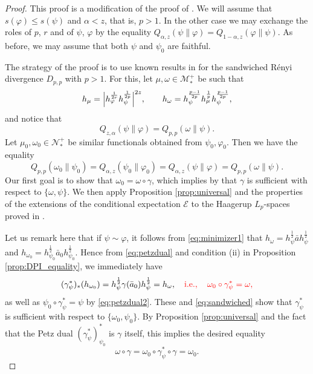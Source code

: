\documentclass[12pt]{article}
\theoremstyle{definition}
\theoremstyle{remark}
\numberwithin{equation}{section}
\def\cE{\mathcal E}
\def\Me{\mathcal M}
\def\Ne{\mathcal N}
\def\ffi{\varphi}
\begin{document}
\begin{proof} This proof is a modification of the proof of \cite[Theorem
5.1]{jencova2021renyi}.  
We will assume that $s(\ffi)\le s(\psi)$ and $\alpha<z$, that is, $p>1$. In the other case we may
exchange the roles of $p$, $r$ and of $\psi$, $\ffi$ by the equality
$Q_{\alpha,z}(\psi\|\varphi)=Q_{1-\alpha,z}(\varphi\|\psi)$. As before, we may assume that
both $\psi$ and $\psi_0$ are faithful.

The strategy of the proof is to use known results in \cite{jencova2018renyi} for the sandwiched
R\'enyi divergence $D_{p,p}$ with $p>1$. For this, {\color{red}let $\mu,\omega\in\Me_*^+$ be such that
\[
h_{\mu}=\Big|h_{\ffi}^{1\over 2r}h_{\psi}^{1\over 2p}\Big|^{2z},\qquad
h_\omega=h_\psi^{p-1\over 2p}h_\mu^{\frac1p}h_\psi^{p-1\over 2p},
\]}
and notice that
\[
Q_{z,\alpha}(\psi\|\ffi)=Q_{p,p}(\omega\|\psi).
\]
Let $\mu_0,\omega_0\in \Ne_*^+$ be similar functionals obtained from $\psi_0,\ffi_0$. Then
we have the equality
\begin{equation}\label{eq:sandwiched}
Q_{p,p}(\omega_0\|\psi_0)=Q_{\alpha,z}(\psi_0\|\ffi_0)=Q_{\alpha,z}(\psi\|\ffi)=Q_{p,p}(\omega\|\psi).
\end{equation}
Our first goal is to show that $\omega_0=\omega\circ\gamma$, which implies by
\cite[Theorem 4.6]{jencova2018renyi} that $\gamma$ is sufficient with respect to $\{\omega,\psi\}$. 
We then apply Proposition \ref{prop:universal} and the properties of the extensions of the
conditional expectation $\cE$ to the Haagerup $L_p$-spaces proved in
\cite{junge2003noncommutative}. 

Let us remark here that if $\psi\sim \ffi$, {\color{red}it follows from \eqref{eq:minimizer1} that}
$h_\omega=h_\psi^{\frac12}\bar ah_\psi^{\frac12}$ and
$h_{\omega_0}=h_{\psi_0}^{\frac12}\bar a_0h_{\psi_0}^{\frac12}$. Hence from {\color{red}\eqref{eq:petzdual}
and condition (ii)} in Proposition \ref{prop:DPI_equality}, we immediately have
\[
(\gamma^*_{\psi})_*(h_{\omega_0})=h_\psi^{\frac12}\gamma(\bar
a_0)h_\psi^{\frac12}=h_\omega,\quad
{\color{red}\mbox{i.e.},\quad\omega_0\circ\gamma_\psi^*=\omega,}
\]
{\color{red}as well as $\psi_0\circ\gamma_\psi^*=\psi$ by \eqref{eq:petzdual2}.}
These and \eqref{eq:sandwiched} {\color{red}show} that $\gamma^*_\psi$ is sufficient with respect to
$\{\omega_0,\psi_0\}$. By Proposition \ref{prop:universal} and the fact that the
Petz dual  $(\gamma_\psi^*)_{\psi_0}^*$ is $\gamma$ itself, this implies the desired
equality
\[
\omega\circ\gamma= \omega_0\circ \gamma_\psi^*\circ\gamma=\omega_0.
\]


\end{proof}
\end{document}
